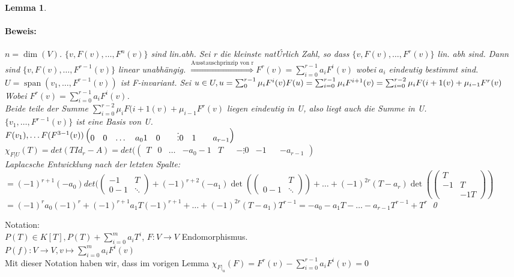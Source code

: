 \documentclass{report}
\newcommand{\ve}[1]{{\begin{pmatrix}#1 \end{pmatrix}}}
\DeclareMathOperator{\Span}{span}
\theoremstyle{customrem}
\theoremstyle{customdef}
\newtheorem{lemma}[definition]{Lemma}
\renewenvironment{proof}{\paragraph{Beweis: }}{\qed}
\theoremstyle{customenv}
\begin{document}
\begin{lemma}
  \begin{proof}
    \(n = \dim(V)\).
    \(\{v, F(v), \dots, F^n(v)\}\) sind lin.abh. Sei r die kleinste nat\'Urlich Zahl,
    so dass \(\{v, F(v), \dots, F^r(v)\}\) lin. abh sind. Dann sind
    \(\{v, F(v), \dots, F^{r-1}(v)\}\) linear unabh\"angig.
    \(\overset{\text{Ausstauschprinzip von r}}{\Rightarrow} F^r(v) = \sum_{i=0}^{r-1} a_i F^i(v)\)
    wobei \(a_i\) eindeutig bestimmt sind.\\
    \(U = \Span(v_1, \dots, F^{r-1}(v))\) ist F-invariant. Sei \(u \in U, u = \sum_{0}^{r-1} \mu_iF^i(v)\\
    F(u) = \sum_{i=0}^{r-1} \mu_i F^{i+1}(v)\\
    = \sum_{i=0}^{r-2} \mu_iF({i+1}(v) + \mu_{i-1}F^r(v)\)
    Wobei \(F^r(v) = \sum_{i=0}^{r-1} a_iF^i(v)\).\\
    Beide teile der Summe \(\sum_{i=0}^{r-2} \mu_iF({i+1}(v) + \mu_{i-1}F^r(v)\) liegen eindeutig in U, also liegt auch die Summe in U.\\
    \(\{v_1, \dots, F^{r-1}(v)\}\) ist eine Basis von U.\\
    \(F(v_1), \dots F(F^{3-1}(v))\\
    \begin{pmatrix}
      0 & 0 & \dots & a_0
      1 & 0 &       & \vdots
      0 & 1 &       & a_{r-1}
    \end{pmatrix}\)\\
    \(\chi_{F|U}(T) = det(T Id_r - A)
    = det(    \begin{pmatrix}
      T & 0 & \dots & -a_0
      -1 & T &       & -\vdots
      0 & -1 &       & -a_{r-1}
    \end{pmatrix}\)\\
    Laplacsche Entwicklung nach der letzten Spalte:
    \(= (-1)^{r+1}(-a_0) det(\ve{-1 & T\\0 -1 & \ddots} + (-1)^{r+2}(-a_1)\det(\ve{& T\\0 -1 & \ddots}) + \dots + (-1)^{2r} (T - a_r) \det(\ve{T\\-1 & T\\  & -1 T})\)
    \(= (-1)^r a_0 (-1)^r + (-1)^{r+1} a_1T (-1)^{r+1} + \dots + (-1)^{2r}(T - a_1)T^{r-1}
    = - a_0 - a_1 T - \dots - a_{r-1}T^{r-1} + T^r\)
  \end{proof}
\end{lemma}

Notation:\\
\(P(T) \in K[T], P(T) + \sum_{i=0}^m a_iT^i\), \(F : V \to V\) Endomorphismus.\\
\(P(f) : V \to V, v \mapsto \sum_{i=0}^m a_iF^i(v)\)\\
Mit dieser Notation haben wir, dass im vorigen Lemma
\(\chi_{F|_u}(F) = F^r(v) - \sum_{i=0}^{r-1} a_i F^i(v) = 0\)
\end{document}
